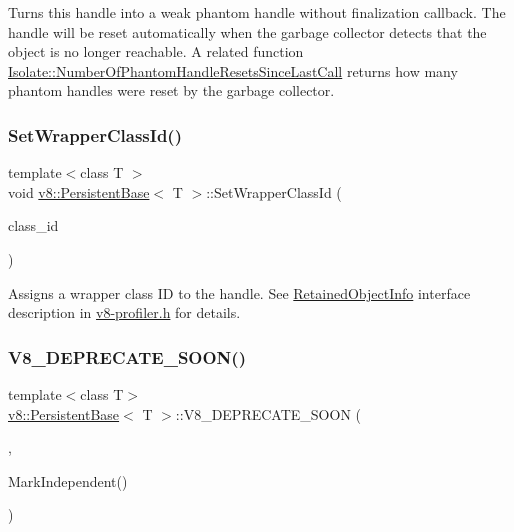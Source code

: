 Turns this handle into a weak phantom handle without finalization callback. The handle will be reset automatically when the garbage collector detects that the object is no longer reachable. A related function \mbox{\hyperlink{classv8_1_1Isolate_aa7df97ed0ea96925e60f519ffc09a33a}{Isolate\+::\+Number\+Of\+Phantom\+Handle\+Resets\+Since\+Last\+Call}} returns how many phantom handles were reset by the garbage collector. \mbox{\label{classv8_1_1PersistentBase_ac4c979164b3ed4dc92319e6f5a108d3d}} 
\subsubsection{\texorpdfstring{Set\+Wrapper\+Class\+Id()}{SetWrapperClassId()}}
{\footnotesize\ttfamily template$<$class T $>$ \\
void \mbox{\hyperlink{classv8_1_1PersistentBase}{v8\+::\+Persistent\+Base}}$<$ T $>$\+::Set\+Wrapper\+Class\+Id (\begin{DoxyParamCaption}\item[{uint16\+\_\+t}]{class\+\_\+id }\end{DoxyParamCaption})}

Assigns a wrapper class ID to the handle. See \mbox{\hyperlink{classv8_1_1RetainedObjectInfo}{Retained\+Object\+Info}} interface description in \mbox{\hyperlink{v8-profiler_8h_source}{v8-\/profiler.\+h}} for details. \mbox{\label{classv8_1_1PersistentBase_a760df2921447e2344ec564d0268d9d1c}} 
\subsubsection{\texorpdfstring{V8\+\_\+\+D\+E\+P\+R\+E\+C\+A\+T\+E\+\_\+\+S\+O\+O\+N()}{V8\_DEPRECATE\_SOON()}}
{\footnotesize\ttfamily template$<$class T$>$ \\
\mbox{\hyperlink{classv8_1_1PersistentBase}{v8\+::\+Persistent\+Base}}$<$ T $>$\+::V8\+\_\+\+D\+E\+P\+R\+E\+C\+A\+T\+E\+\_\+\+S\+O\+ON (\begin{DoxyParamCaption}\item[{\char`\"{}Objects are always considered independent. \char`\"{} \char`\"{}Use \mbox{\hyperlink{classv8_1_1PersistentBase_a7244edd33a45b7d95e566fce85e3f87d}{Mark\+Active}} to avoid collecting otherwise dead weak handles.\char`\"{}}]{,  }\item[{V8\+\_\+\+I\+N\+L\+I\+NE void }]{Mark\+Independent() }\end{DoxyParamCaption})}

